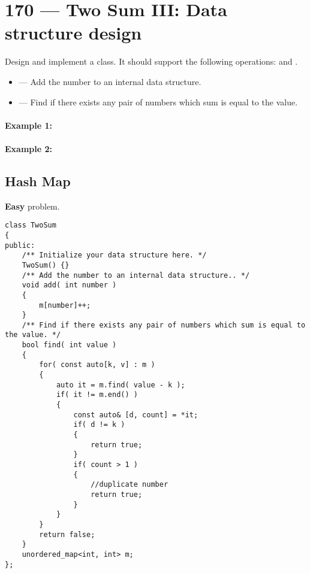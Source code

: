 \section{170 --- Two Sum III: Data structure design}
Design and implement a  class. It should support the following operations: and .
\begin{itemize}
\item {} --- Add the number to an internal data structure.
\item {} --- Find if there exists any pair of numbers which sum is equal to the value.
\end{itemize}

\paragraph{Example 1:}

\begin{flushleft}


\end{flushleft}

\paragraph{Example 2:}

\begin{flushleft}


\end{flushleft}

\subsection{Hash Map}
\textbf{Easy} problem.\setcounter{lstlisting}{0}
\begin{lstlisting}[style=customc, caption={Hash Map}]
class TwoSum
{
public:
    /** Initialize your data structure here. */
    TwoSum() {}
    /** Add the number to an internal data structure.. */
    void add( int number )
    {
        m[number]++;
    }
    /** Find if there exists any pair of numbers which sum is equal to the value. */
    bool find( int value )
    {
        for( const auto[k, v] : m )
        {
            auto it = m.find( value - k );
            if( it != m.end() )
            {
                const auto& [d, count] = *it;
                if( d != k )
                {
                    return true;
                }
                if( count > 1 )
                {
                    //duplicate number
                    return true;
                }
            }
        }
        return false;
    }
    unordered_map<int, int> m;
};
\end{lstlisting}

